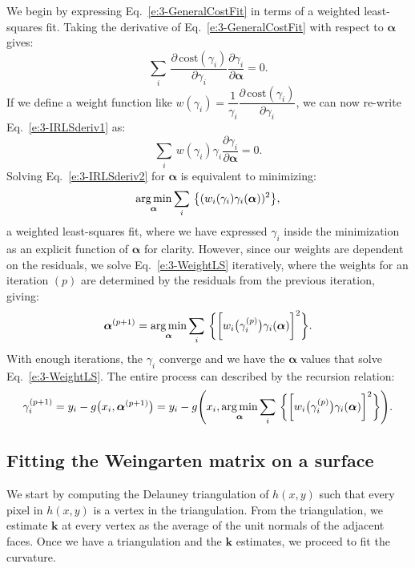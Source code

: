 We begin by expressing Eq.~\ref{e:3-GeneralCostFit} in terms of a weighted least-squares fit.
Taking the derivative of Eq.~\ref{e:3-GeneralCostFit} with respect to $\bm{\alpha}$ gives:
\begin{equation}
  \sum\limits_i\,\frac{\partial \, \textrm{cost}(\gamma_i)}{\partial \gamma_i} \frac{\partial \gamma_i}{\partial \bm{\alpha}} = 0.\label{e:3-IRLSderiv1}
\end{equation}
If we define a weight function like $w(\gamma_i) = \dfrac{1}{\gamma_i}\dfrac{\partial \, \textrm{cost}(\gamma_i)}{\partial \gamma_i}$, we can now re-write Eq.~\ref{e:3-IRLSderiv1} as:
\begin{equation}
  \sum\limits_i\,w(\gamma_i) \gamma_i \frac{\partial \gamma_i}{\partial \bm{\alpha}} = 0.\label{e:3-IRLSderiv2}
\end{equation}
 Solving Eq.~\ref{e:3-IRLSderiv2} for $\bm{\alpha}$ is equivalent to minimizing:
 \begin{equation}
   \operatorname*{arg\,min}_{\bm{\alpha}} \sum\limits_i\,\big \{ (w_i(\gamma_i) \gamma_i(\bm{\alpha}))^2 \big \},\label{e:3-WeightLS}
 \end{equation}
a weighted least-squares fit, where we have expressed $\gamma_i$ inside the minimization as an explicit function of $\bm{\alpha}$ for clarity.
However, since our weights are dependent on the residuals, we solve Eq.~\ref{e:3-WeightLS} iteratively, where the weights for an iteration $(p)$ are determined by the residuals from the previous iteration, giving:
\begin{equation}
  \bm{\alpha}^{(p+1)} = \operatorname*{arg\,min}_{\bm{\alpha}} \sum\limits_i\,\bigg \{ \bigg [w_i \big(\gamma_i^{(p)}\big ) \gamma_i(\bm{\alpha}) \bigg ]^2 \bigg \}.
\end{equation}
With enough iterations, the $\gamma_i$ converge and we have the $\bm{\alpha}$ values that solve Eq.~\ref{e:3-WeightLS}.
The entire process can described by the recursion relation:
\begin{equation}
  \gamma_i^{(p+1)} = y_i - g\big (x_i,\bm{\alpha}^{(p+1)}\big )= y_i - g\Bigg (x_i, \operatorname*{arg\,min}_{\bm{\alpha}} \sum\limits_i\,\bigg \{ \bigg [w_i \big(\gamma_i^{(p)}\big ) \gamma_i(\bm{\alpha}) \bigg ]^2 \bigg \} \Bigg).
\end{equation}


\subsection{Fitting the Weingarten matrix on a surface}
We start by computing the Delauney triangulation of $h(x,y)$ such that every pixel in $h(x,y)$ is a vertex in the triangulation.
From the triangulation, we estimate $\mathbf{k}$ at every vertex as the average of the unit normals of the adjacent faces.
Once we have a triangulation and the $\mathbf{k}$ estimates, we proceed to fit the curvature.\\


